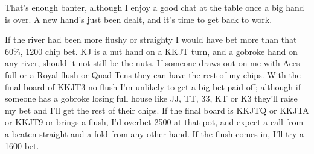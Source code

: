 That's enough banter, although I enjoy a good chat at the table
once a big hand is over. A new hand's just been dealt, and
it's time to get back to work.

If the river had been more flushy or straighty I would have bet more
than that 60\%, 1200 chip bet. KJ is a nut hand on a KKJT turn, and a
gobroke hand on any river, should it not still be the nuts.
If someone draws out on me with Aces full or a Royal flush or Quad
Tens they can have the rest of my chips. With the final board of KKJT3
no flush I'm unlikely to get a big bet paid off; although if someone
has a gobroke losing full house like JJ, TT, 33, KT or K3 they'll
raise my bet and I'll get the rest of their chips. If the final board
is KKJTQ or KKJTA or KKJT9 or brings a flush, I'd overbet 2500 at that
pot, and expect a call from a beaten straight and a fold from any
other hand. If the flush comes in, I'll try a 1600 bet.

